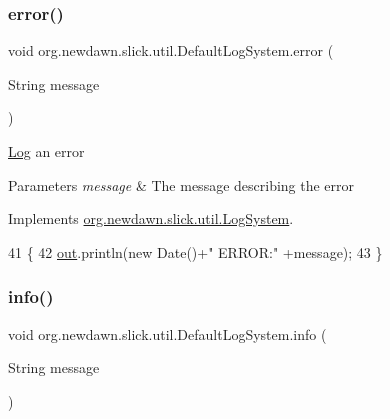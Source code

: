 \subsubsection{\texorpdfstring{error()}{error()}\hspace{0.1cm}{\footnotesize\ttfamily [3/3]}}
{\footnotesize\ttfamily void org.\+newdawn.\+slick.\+util.\+Default\+Log\+System.\+error (\begin{DoxyParamCaption}\item[{String}]{message }\end{DoxyParamCaption})\hspace{0.3cm}{\ttfamily [inline]}}

\mbox{\hyperlink{classorg_1_1newdawn_1_1slick_1_1util_1_1_log}{Log}} an error


\begin{DoxyParams}{Parameters}
{\em message} & The message describing the error \\
\hline
\end{DoxyParams}


Implements \mbox{\hyperlink{interfaceorg_1_1newdawn_1_1slick_1_1util_1_1_log_system_a5ac24f5df1c272d98f386698f6b8ba2a}{org.\+newdawn.\+slick.\+util.\+Log\+System}}.


\begin{DoxyCode}
41                                       \{
42         \mbox{\hyperlink{classorg_1_1newdawn_1_1slick_1_1util_1_1_default_log_system_af8720c665caabb6455863d23de8617da}{out}}.println(\textcolor{keyword}{new} Date()+\textcolor{stringliteral}{" ERROR:"} +message);
43     \}
\end{DoxyCode}
\mbox{\label{classorg_1_1newdawn_1_1slick_1_1util_1_1_default_log_system_a07edffad8b8eb3bd937f82110621b761}} 
\subsubsection{\texorpdfstring{info()}{info()}}
{\footnotesize\ttfamily void org.\+newdawn.\+slick.\+util.\+Default\+Log\+System.\+info (\begin{DoxyParamCaption}\item[{String}]{message }\end{DoxyParamCaption})\hspace{0.3cm}{\ttfamily [inline]}}

